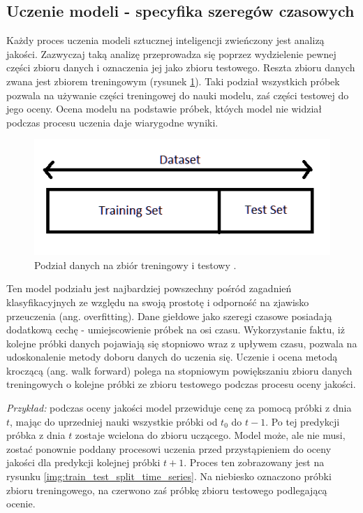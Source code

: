 \documentclass[a4paper, twoside, 11pt, openright]{article}
\begin{document}
\subsection{Uczenie modeli - specyfika szeregów czasowych}

Każdy proces uczenia modeli sztucznej inteligencji zwieńczony jest analizą jakości. Zazwyczaj taką analizę przeprowadza się poprzez wydzielenie pewnej części zbioru danych i oznaczenia jej jako zbioru testowego. Reszta zbioru danych zwana jest zbiorem treningowym (rysunek \ref{img:train_test_split}). Taki podział wszystkich próbek pozwala na używanie części treningowej do nauki modelu, zaś części testowej do jego oceny. Ocena modelu na podstawie próbek, któych model nie widział podczas procesu uczenia daje wiarygodne wyniki.

\begin{figure}[H]
\centering 
\includegraphics[scale=0.5]{img/train_test_split.png}
\caption{Podział danych na zbiór treningowy i testowy \cite{train_test_split}.}
\label{img:train_test_split}
\end{figure}

Ten model podziału jest najbardziej powszechny pośród zagadnień klasyfikacyjnych ze względu na swoją prostotę i odporność na zjawisko przeuczenia (ang. overfitting). Dane giełdowe jako szeregi czasowe posiadają dodatkową cechę - umiejscowienie próbek na osi czasu. Wykorzystanie faktu, iż kolejne próbki danych pojawiają się stopniowo wraz z upływem czasu, pozwala na udoskonalenie metody doboru danych do uczenia się. Uczenie i ocena metodą kroczącą (ang. walk forward) polega na stopniowym powiększaniu zbioru danych treningowych o kolejne próbki ze zbioru testowego podczas procesu oceny jakości. 

\textit{Przykład:} podczas oceny jakości model przewiduje cenę za pomocą próbki z dnia $t$, mając do uprzedniej nauki wszystkie próbki od $t_0$ do $t-1$. Po tej predykcji próbka z dnia $t$ zostaje wcielona do zbioru uczącego. Model może, ale nie musi, zostać ponownie poddany procesowi uczenia przed przystąpieniem do oceny jakości dla predykcji kolejnej próbki $t+1$. Proces ten zobrazowany jest na rysunku \ref{img:train_test_split_time_series}. Na niebiesko oznaczono próbki zbioru treningowego, na czerwono zaś próbkę zbioru testowego podlegającą ocenie.
\end{document}
